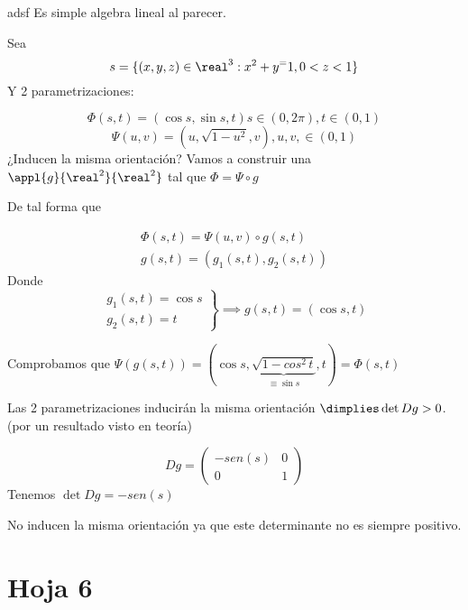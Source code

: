 \begin{problem}[10]

adsf
\solution
Es simple algebra lineal al parecer.
\end{problem}

\begin{problem}[11]
Sea \[s=\{(x,y,z)\in\real^3: x^2+y^=1, 0<z<1\}\]
Y 2 parametrizaciones:

\[\Phi(s,t)  = (\cos s,\sin s,t) s\in(0,2\pi),t\in(0,1)\]
\[\Psi(u,v)=(u,\sqrt{1-u^2},v),u,v,\in(0,1)\]
¿Inducen la misma orientación?
\solution
Vamos a construir una $\appl{g}{\real^2}{\real^2}$ tal que $\Phi = \Psi \circ g$

De tal forma que

\[\begin{array}{c}
\Phi(s,t) = \Psi(u,v)\circ g(s,t)\\
g(s,t) = (g_1(s,t),g_2(s,t))
\end{array}\]
Donde \[\left.\begin{array}{c}
g_1 (s,t) = \cos s\\
g_2(s,t) = t
\end{array}\right\}\implies g(s,t)= (\cos s,t)\]

Comprobamos que $\Psi(g(s,t)) = (\cos s,\underbrace{\sqrt{1-cos^2\,t}}_{\equiv \sin s},t) = \Phi(s,t)$

Las 2 parametrizaciones inducirán la misma orientación $\dimplies \det Dg > 0$. (por un resultado visto en teoría)

\[Dg = \begin{pmatrix}
-sen(s)&0\\0&1
\end{pmatrix}\]
Tenemos $\det Dg = -sen(s)$

No inducen la misma orientación ya que este determinante no es siempre positivo.

\end{problem}

\section{Hoja 6}

